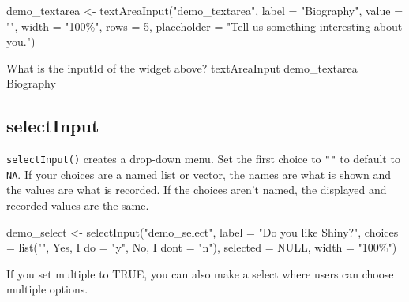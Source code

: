 \documentclass[
  oneside]{book}
\newenvironment{Shaded}{\begin{snugshade}}{\end{snugshade}}
\newcommand{\AttributeTok}[1]{\textcolor[rgb]{0.77,0.63,0.00}{#1}}
\newcommand{\ConstantTok}[1]{\textcolor[rgb]{0.00,0.00,0.00}{#1}}
\newcommand{\DecValTok}[1]{\textcolor[rgb]{0.00,0.00,0.81}{#1}}
\newcommand{\FunctionTok}[1]{\textcolor[rgb]{0.00,0.00,0.00}{#1}}
\newcommand{\NormalTok}[1]{#1}
\newcommand{\OtherTok}[1]{\textcolor[rgb]{0.56,0.35,0.01}{#1}}
\newcommand{\StringTok}[1]{\textcolor[rgb]{0.31,0.60,0.02}{#1}}
\begin{document}
\begin{Shaded}
\begin{Highlighting}[]
\NormalTok{demo\_textarea }\OtherTok{\textless{}{-}} \FunctionTok{textAreaInput}\NormalTok{(}\StringTok{"demo\_textarea"}\NormalTok{, }\AttributeTok{label =} \StringTok{"Biography"}\NormalTok{, }\AttributeTok{value =} \StringTok{""}\NormalTok{,}
    \AttributeTok{width =} \StringTok{"100\%"}\NormalTok{, }\AttributeTok{rows =} \DecValTok{5}\NormalTok{, }\AttributeTok{placeholder =} \StringTok{"Tell us something interesting about you."}\NormalTok{)}
\end{Highlighting}
\end{Shaded}

What is the \AttributeTok{inputId} of the widget above?
textAreaInput demo\_textarea Biography

\hypertarget{selectinput}{%
\subsection{selectInput}\label{selectinput}}

\texttt{selectInput}\texttt{()} creates a drop-down menu. Set the first \AttributeTok{choice} to \texttt{""} to default to \texttt{NA}. If your choices are a named list or vector, the names are what is shown and the values are what is recorded. If the choices aren't named, the displayed and recorded values are the same.

\begin{Shaded}
\begin{Highlighting}[]
\NormalTok{demo\_select }\OtherTok{\textless{}{-}} \FunctionTok{selectInput}\NormalTok{(}\StringTok{"demo\_select"}\NormalTok{, }\AttributeTok{label =} \StringTok{"Do you like Shiny?"}\NormalTok{, }\AttributeTok{choices =} \FunctionTok{list}\NormalTok{(}\StringTok{""}\NormalTok{,}
    \StringTok{\textasciigrave{}}\AttributeTok{Yes, I do}\StringTok{\textasciigrave{}} \OtherTok{=} \StringTok{"y"}\NormalTok{, }\StringTok{\textasciigrave{}}\AttributeTok{No, I don\textquotesingle{}t}\StringTok{\textasciigrave{}} \OtherTok{=} \StringTok{"n"}\NormalTok{), }\AttributeTok{selected =} \ConstantTok{NULL}\NormalTok{, }\AttributeTok{width =} \StringTok{"100\%"}\NormalTok{)}
\end{Highlighting}
\end{Shaded}

If you set \AttributeTok{multiple} to \ConstantTok{TRUE}, you can also make a select where users can choose multiple options.
\end{document}
